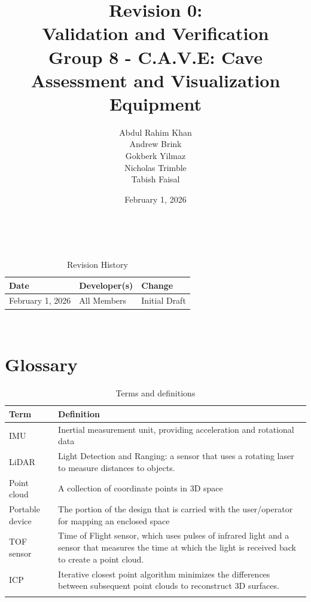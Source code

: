 \documentclass[11pt]{article}
\title{\textbf{Revision 0: \\Validation and Verification \\ \large Group 8 - C.A.V.E: Cave Assessment and Visualization Equipment}}
\author{Abdul Rahim Khan \\ Andrew Brink \\ Gokberk Yilmaz \\ Nicholas Trimble \\ Tabish Faisal}
\date{February 1, 2026}
\begin{document}
	
	\maketitle
	~\newpage
	\renewcommand{\thetable}{\Roman{table}}
	\setcounter{table}{0}
	\begin{table}[hp]
		\caption{Revision History} \label{TblRevisionHistory}
		\begin{tabularx}{\textwidth}{llX}
			\toprule
			\textbf{Date} & \textbf{Developer(s)} & \textbf{Change}\\
			\midrule
			February 1, 2026 & All Members & Initial Draft\\
			\bottomrule
		\end{tabularx}
	\end{table}
	
	~\newpage
	\section*{Glossary}
		\setcounter{table}{1}
	\begin{table}[hp]
		\centering
		\begin{tabularx}{\textwidth}{X p{}}
			\toprule
			\textbf{Term} & \textbf{Definition} \\
			\midrule
			IMU & Inertial measurement unit, providing acceleration and rotational data \\
			\addlinespace
			LiDAR & Light Detection and Ranging: a sensor that uses a rotating laser to measure distances to objects. \\
			\addlinespace
			Point cloud & A collection of coordinate points in 3D space \\
			\addlinespace
			Portable device & The portion of the design that is carried with the user/operator for mapping an enclosed space \\
			\addlinespace
			TOF sensor & Time of Flight sensor, which uses pulses of infrared light and a sensor that measures the time at which the light is received back to create a point cloud. \\
			\addlinespace
			ICP & Iterative closest point algorithm minimizes the differences between subsequent point clouds to reconstruct 3D surfaces. \\
			\bottomrule
			\caption{Terms and definitions}
		\end{tabularx}
	\end{table}
	~\newpage
	
	{
		\tableofcontents
	}
	
\end{document}
